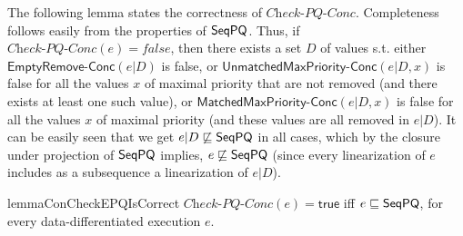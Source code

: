 %
%
%

The following lemma states the correctness of $\textit{Check-PQ-Conc}$. Completeness follows easily from the properties of $\mathsf{SeqPQ}$. Thus, if $\textit{Check-PQ-Conc}(e) = \textit{false}$, then there exists a set $D$ of values s.t. either  $\mathsf{EmptyRemove\text{-}Conc}(e \vert D)$ is false, or $\mathsf{UnmatchedMaxPriority\text{-}Conc}(e \vert D,x)$ is false for all the values $x$ of maximal priority that are not removed (and there exists at least one such value), or $\mathsf{MatchedMaxPriority\text{-}Conc}(e \vert D,x)$ is false for all the values $x$ of maximal priority (and these values are all removed in $e \vert D$). It can be easily seen that we get $e \vert D\not\sqsubseteq \mathsf{SeqPQ}$ in all cases, which by the closure under projection of $\mathsf{SeqPQ}$ implies, $e \not\sqsubseteq \mathsf{SeqPQ}$ (since every linearization of $e$ includes as a subsequence a linearization of $e \vert D$).

\begin{restatable}{lemma}{ConCheckEPQIsCorrect}
\label{lemma:con-check-EPQ is correct}
$\textit{Check-PQ-Conc}(e)=\mathsf{true}$ iff $e \sqsubseteq \mathsf{SeqPQ}$, for every data-differentiated execution $e$.
\end{restatable}


